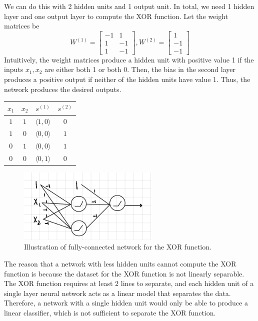 \begin{solution}
    We can do this with 2 hidden units and 1 output unit. In total, we need 1 hidden layer and one output layer to compute the XOR function. Let the weight matrices be
    \[
        W^{(1)} = \begin{bmatrix}
            -1 & 1\\
            1 & -1\\
            1 & -1
        \end{bmatrix},
        W^{(2)} = \begin{bmatrix}
            1\\ -1\\ -1
        \end{bmatrix}
    \]
    Intuitively, the weight matrices produce a hidden unit with positive value 1 if the inputs $x_1, x_2$ are either both 1 or both 0. Then, the bias in the second layer produces a positive output if neither of the hidden units have value 1. Thus, the network produces the desired outputs.
    
    \begin{center}
        \begin{tabular}{|c|c|c|c|}
            \hline
            $x_1$ & $x_2$ & $s^{(1)}$ & $s^{(2)}$\\
            \hline
            $1$ & $1$ & $\langle 1, 0 \rangle$ & $0$\\
            $1$ & $0$ & $\langle 0, 0 \rangle$ & $1$\\
            $0$ & $1$ & $\langle 0, 0 \rangle$ & $1$\\
            $0$ & $0$ & $\langle 0, 1 \rangle$ & $0$\\
            \hline
        \end{tabular}
    \end{center}
    
    \begin{figure}[H]
        \centering
        \includegraphics[width=0.6\textwidth]{images/1e.png}
        \caption{Illustration of fully-connected network for the XOR function.}
        \label{fig:1e}
    \end{figure}

    The reason that a network with less hidden units cannot compute the XOR function is because the dataset for the XOR function is not linearly separable. The XOR function requires at least 2 lines to separate, and each hidden unit of a single layer neural network acts as a linear model that separates the data. Therefore, a network with a single hidden unit would only be able to produce a linear classifier, which is not sufficient to separate the XOR function.
\end{solution}


